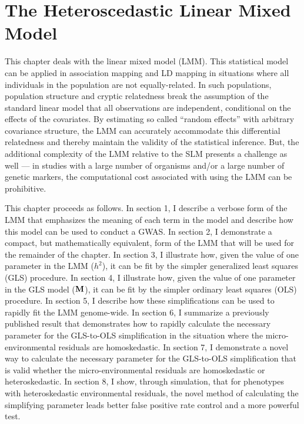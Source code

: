 \chapter{The Heteroscedastic Linear Mixed Model}
\label{chap:het_LMM}


This chapter deals with the linear mixed model (LMM).
This statistical model can be applied in association mapping and LD mapping in situations where all individuals in the population are not equally-related.
In such populations, population structure and cryptic relatedness break the assumption of the standard linear model that all observations are independent, conditional on the effects of the covariates.
By estimating so called ``random effects'' with arbitrary covariance structure, the LMM can accurately accommodate this differential relatedness and thereby maintain the validity of the statistical inference.
But, the additional complexity of the LMM relative to the SLM presents a challenge as well --- in studies with a large number of organisms and/or a large number of genetic markers, the computational cost associated with using the LMM can be prohibitive.

This chapter proceeds as follows.
In section 1, I describe a verbose form of the LMM that emphasizes the meaning of each term in the model and describe how this model can be used to conduct a GWAS.
In section 2, I demonstrate a compact, but mathematically equivalent, form of the LMM that will be used for the remainder of the chapter.
In section 3, I illustrate how, given the value of one parameter in the LMM ($h^2$), it can be fit by the simpler generalized least squares (GLS) procedure.
In section 4, I illustrate how, given the value of one parameter in the GLS model ($\mathbf{M}$), it can be fit by the simpler ordinary least squares (OLS) procedure.
In section 5, I describe how these simplifications can be used to rapidly fit the LMM genome-wide.
In section 6, I summarize a previously published result that demonstrates how to rapidly calculate the necessary parameter for the GLS-to-OLS simplification in the situation where the micro-environmental residuals are homoskedastic.
In section 7, I demonstrate a novel way to calculate the necessary parameter for the GLS-to-OLS simplification that is valid whether the micro-environmental residuals are homoskedastic or heteroskedastic.
In section 8, I show, through simulation, that for phenotypes with heteroskedastic environmental residuals, the novel method of calculating the simplifying parameter leads better false positive rate control and a more powerful test.

